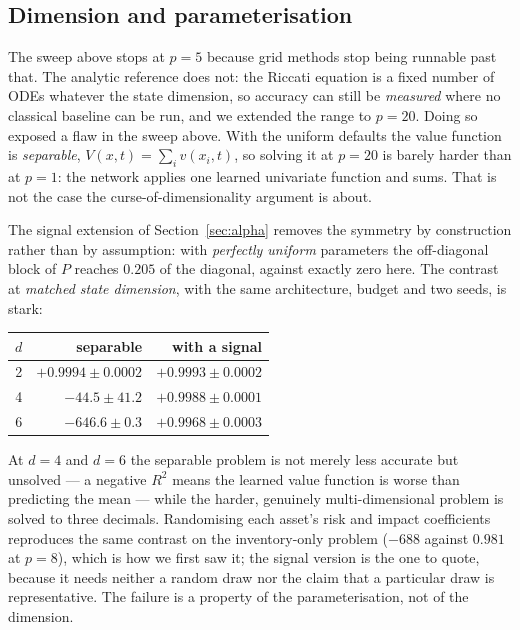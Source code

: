 \documentclass[conference]{IEEEtran}
\begin{document}


\subsection{Dimension and parameterisation}\label{sec:highdim}

The sweep above stops at $p=5$ because grid methods stop being runnable past that. The analytic
reference does not: the Riccati equation is a fixed number of ODEs whatever the state dimension, so
accuracy can still be \emph{measured} where no classical baseline can be run, and we extended the
range to $p=20$. Doing so exposed a flaw in the sweep above. With the uniform defaults the value
function is \emph{separable}, $V(x,t)=\sum_i v(x_i,t)$, so solving it at $p=20$ is barely harder than
at $p=1$: the network applies one learned univariate function and sums. That is not the case the
curse-of-dimensionality argument is about.

The signal extension of Section~\ref{sec:alpha} removes the symmetry by construction rather than by
assumption: with \emph{perfectly uniform} parameters the off-diagonal block of $P$ reaches $0.205$
of the diagonal, against exactly zero here. The contrast at \emph{matched state dimension},
with the same architecture, budget and two seeds, is stark:

\begin{center}
\small
\begin{tabular}{rrr}
\toprule
$d$ & separable & with a signal \\
\midrule
2 & $+0.9994 \pm 0.0002$ & $+0.9993 \pm 0.0002$ \\
4 & $-44.5 \pm 41.2$ & $+0.9988 \pm 0.0001$ \\
6 & $-646.6 \pm 0.3$ & $+0.9968 \pm 0.0003$ \\
\bottomrule
\end{tabular}
\end{center}

\noindent At $d=4$ and $d=6$ the separable problem is not merely less accurate but unsolved --- a
negative $R^2$ means the learned value function is worse than predicting the mean --- while the
harder, genuinely multi-dimensional problem is solved to three decimals. Randomising each asset's
risk and impact coefficients reproduces the same contrast on the inventory-only problem ($-688$
against $0.981$ at $p=8$), which is how we first saw it; the signal version is the one to quote,
because it needs neither a random draw nor the claim that a particular draw is representative. The
failure is a property of the parameterisation, not of the dimension.
\end{document}
